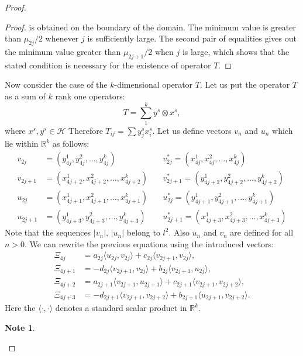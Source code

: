\documentclass[12pt]{article}
\newcommand\inner[2]{\langle #1, #2 \rangle}
\renewcommand{\cal}[1]{\mathcal{#1}}
\theoremstyle{definition}
\newtheorem*{note}{Note}
\numberwithin{remark}{section}
\numberwithin{theorem}{section}
\numberwithin{prop}{section}
\numberwithin{equation}{section}
\numberwithin{lemma}{section}
\numberwithin{prop_under_lemma}{lemma}
\begin{document}
\begin{proof}
\begin{proof}
            is obtained on the boundary of the domain. The minimum value is greater than $\mu_{2j}/2$ whenever $j$ is
            sufficiently large.
            The second pair of equalities gives out the minimum value greater than $\mu_{2j+1}/2$ when $j$ is large,
            which shows that the stated condition is necessary for the existence of operator $T$.
        \end{proof}
        Now consider the case of the $k$-dimensional operator $T$.
        Let us put the operator $T$ as a sum of $k$ rank one operators:
        $$
            T = \sum_1^k y^s \otimes x^s,
        $$
        where $x^s, y^s \in \cal{H}$
        Therefore $T_{ij} = \sum {y^s_j x^s_i}$.
        Let us define vectors $v_n$ and $u_n$ which lie within $\mathbb{R}^k$ as follows:
        \begin{align*}
            v_{2j} &= (y^1_{4j}, y^2_{4j}, \dots ,y^k_{4j}) \quad
            &v^*_{2j} = (x^1_{4j}, x^2_{4j}, \dots ,x^k_{4j}) \\
            v_{2j+1} &= (x^1_{4j+2}, x^2_{4j+2}, \dots ,x^k_{4j+2}) \quad
            &v^*_{2j+1} = (y^1_{4j+2}, y^2_{4j+2}, \dots ,y^k_{4j+2}) \\
            u_{2j} &= (x^1_{4j+1}, x^2_{4j+1}, \dots ,x^k_{4j+1}) \quad
            &u^*_{2j} = (y^1_{4j+1}, y^2_{4j+1}, \dots ,y^k_{4j+1}) \\
            u_{2j+1} &= (y^1_{4j+3}, y^2_{4j+3}, \dots ,y^k_{4j+3}) \quad
            &u^*_{2j+1} = (x^1_{4j+3}, x^2_{4j+3}, \dots ,x^k_{4j+3}) 
        \end{align*}
        Note that the sequences $|v_n|$, $|u_n|$ belong to $l^2$. Also $u_n$ and $v_n$ are defined for all $n > 0$.
        We can rewrite the previous equations using the introduced vectors:
        \begin{align*}
            \Xi_{4j} &= a_{2j} \inner{u_{2j}}{v_{2j}} + c_{2j} \inner{v_{2j+1}}{v_{2j}},\\
            \Xi_{4j + 1} &= -d_{2j} \inner{v_{2j+1}}{v_{2j}} + b_{2j} \inner{v_{2j+1}}{u_{2j}},\\
            \Xi_{4j + 2} &= a_{2j+1} \inner{v_{2j+1}}{u_{2j+1}} + c_{2j+1} \inner{v_{2j+1}}{v_{2j+2}},\\
            \Xi_{4j + 3} &= -d_{2j+1} \inner{v_{2j+1}}{v_{2j+2}} + b_{2j+1} \inner{u_{2j+1}}{v_{2j+2}}.
        \end{align*}
        Here the $\inner{\cdot}{\cdot}$ denotes a standard scalar product in $\mathbb{R}^k$.
        \begin{note}

\end{note}
\end{proof}
\end{document}
